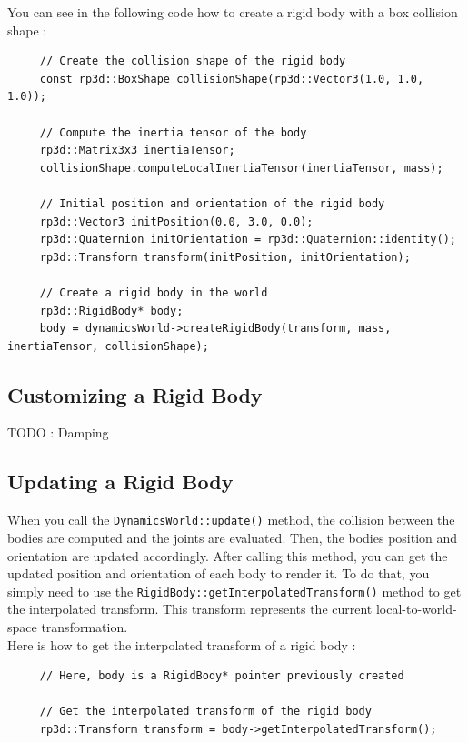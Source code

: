 \documentclass[a4paper,12pt]{article}
\begin{document}
    You can see in the following code how to create a rigid body with a box collision shape : \\

    \begin{lstlisting}
     // Create the collision shape of the rigid body
     const rp3d::BoxShape collisionShape(rp3d::Vector3(1.0, 1.0, 1.0));

     // Compute the inertia tensor of the body
     rp3d::Matrix3x3 inertiaTensor;
     collisionShape.computeLocalInertiaTensor(inertiaTensor, mass);

     // Initial position and orientation of the rigid body
     rp3d::Vector3 initPosition(0.0, 3.0, 0.0);
     rp3d::Quaternion initOrientation = rp3d::Quaternion::identity();
     rp3d::Transform transform(initPosition, initOrientation);

     // Create a rigid body in the world
     rp3d::RigidBody* body;
     body = dynamicsWorld->createRigidBody(transform, mass, inertiaTensor, collisionShape);
  \end{lstlisting}

    \subsection{Customizing a Rigid Body}

    TODO : Damping

    \subsection{Updating a Rigid Body}

    When you call the \texttt{DynamicsWorld::update()} method, the collision between the bodies are computed and the joints are evaluated. Then, the bodies position and orientation
    are updated accordingly. After calling this method, you can get the updated position and orientation of each body to render it. To do that, you simply need to use the
    \texttt{RigidBody::getInterpolatedTransform()} method to get the interpolated transform. This transform represents the current local-to-world-space transformation. \\

    Here is how to get the interpolated transform of a rigid body : \\

    \begin{lstlisting}
     // Here, body is a RigidBody* pointer previously created

     // Get the interpolated transform of the rigid body
     rp3d::Transform transform = body->getInterpolatedTransform();
  \end{lstlisting}
\end{document}
